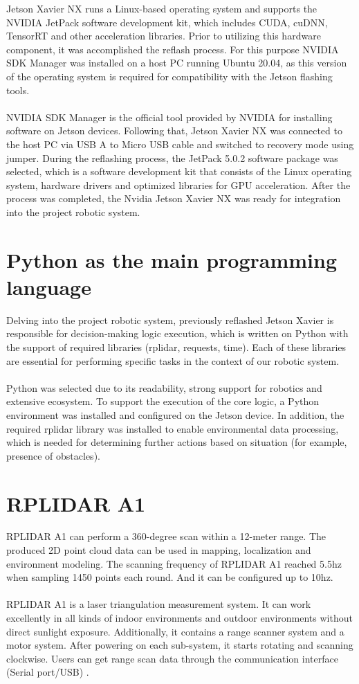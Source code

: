 \documentclass[]{IEEEphot}
\begin{document}
Jetson Xavier NX runs a Linux-based operating system and supports the NVIDIA JetPack software development kit, which includes CUDA, cuDNN, TensorRT and other acceleration libraries. Prior to utilizing this hardware component, it was accomplished the reflash process. For this purpose NVIDIA SDK Manager was installed on a host PC running Ubuntu 20.04, as this version of the operating system is required for compatibility with the Jetson flashing tools. 
\\\\
NVIDIA SDK Manager is the official tool provided by NVIDIA for installing software on Jetson devices. Following that, Jetson Xavier NX was connected to the host PC via USB A to Micro USB cable and switched to recovery mode using jumper. During the reflashing process, the JetPack 5.0.2 software package was selected, which is a software development kit that consists of the Linux operating system, hardware drivers and optimized libraries for GPU acceleration. After the process was completed, the Nvidia Jetson Xavier NX was ready for integration into the project robotic system.

\section{Python as the main programming language}

 Delving into the project robotic system, previously reflashed Jetson Xavier is responsible for decision-making logic execution, which is written on Python with the support of required libraries (rplidar, requests, time). Each of these libraries are essential for performing specific tasks in the context of our robotic system. 
\\\\
Python was selected due to its readability, strong support for robotics and extensive ecosystem. To support the execution of the core logic, a Python environment was installed and configured on the Jetson device. In addition, the required rplidar library was installed to enable environmental data processing, which is needed for determining further actions based on situation (for example, presence of obstacles).

\section{RPLIDAR A1}

RPLIDAR A1 can perform a 360-degree scan within a 12-meter range. The produced 2D point cloud data can be used in mapping, localization and environment modeling. The scanning frequency of RPLIDAR A1 reached 5.5hz when sampling 1450 points each round. And it can be configured up to 10hz.
\\\\
RPLIDAR A1 is a laser triangulation measurement system. It can work excellently in all kinds of indoor environments and outdoor environments without direct sunlight exposure. Additionally, it contains a range scanner system and a motor system. After powering on each sub-system, it starts rotating and scanning clockwise. Users can get range scan data through the communication interface (Serial port/USB) \cite{rplidar}.
\end{document}
